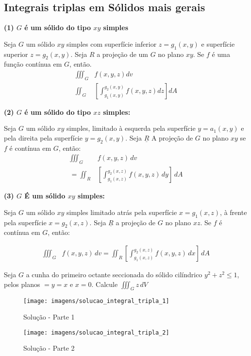\documentclass[portugues, 11pt]{article}
\begin{document}
	\subsection{Integrais triplas em Sólidos mais gerais}
	
	\textbf{(1) $G$ é um sólido do tipo $xy$ simples}
	\begin{thrm}
		Seja $G$ um sólido $xy$ simples com superfície inferior $z=g_1(x,y)$ e superfície superior $z=g_2(x,y)$. Seja $R$ a projeção de um $G$ no plano $xy$. Se $f$ é uma função contínua em $G$, então.
		\begin{align*}
		\iiint_G & {f(x,y,z)}{dv}
		\\
		\iint_G  & \left [\int_{g_1 (x,y)}^{g_2 (x,y)} {f(x,y,z)}{dz} \right ] {dA}
		\end{align*}
	\end{thrm}
	
	\textbf{(2) $G$ é um sólido do tipo $xz$ simples: }
	\begin{thrm}
		Seja $G$ um sólido $xy$ simples, limitado à esquerda pela superfície $y=a_1 (x,y)$ e pela direita pela superfície $y=g_2 (x,y)$. Seja $\underline{R}$ A projeção de $G$ no plano $xy$ se $f$ é contínua em $G$, então: 
		\begin{align*}
			\iiint_G & {f(x,y,z)} \,dv \\
			= \iint_R & \left[ \int_{g_1(x,z)}^{g_2(x,z)}	f(x,y,z) \,dy \right ] \,dA 
		\end{align*}
	\end{thrm}


	\textbf{(3) $G$ É um sólido $xy$ simples:}
	\begin{thrm}
		Seja $G$ um sólido $xy$ simples limitado atrás pela superfície $x=g_1(x,z)$, à frente pela superfície $x=g_2(x,z)$.
		Seja $\underline{R}$ a projeção de $G$ no plano $xz$. Se $f$ é contínua em $G$, então:
		
		\begin{align*}
			\iiint_G & f(x,y,z) \,dv
			= \iint_R \left [ \int_{g_1(x,z)}^{g_2(x,z)} f(x,y,z) \,dx \right ] \,dA
		\end{align*}
	\end{thrm}
	
	\begin{exmp}
		Seja $G$ a cunha do primeiro octante seccionada do sólido cilíndrico $y^2+z^2 \leq 1$, pelos planos $=y=x$ e $x=0$.
		Calcule $\iiint_G z \,dV$ \\
		\begin{figure}[h]
			\centering
			\texttt{[image: imagens/solucao\_integral\_tripla\_1]}
			\caption{Solução - Parte 1}
			\label{fig:int_tripla_1}			
			\texttt{[image: imagens/solucao\_integral\_tripla\_2]}
			\caption{Solução - Parte 2}
			\label{fig:int_tripla_2}			
		\end{figure}
	\end{exmp}
	
\end{document}
